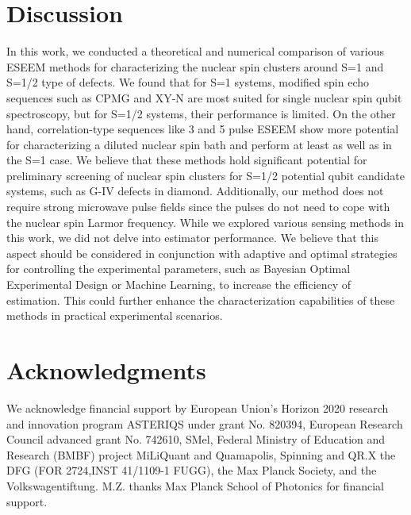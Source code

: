 \documentclass[%
 reprint,
superscriptaddress,
 amsmath,amssymb,
 aps,
]{revtex4-2}
\begin{document}
\section{Discussion}

In this work, we conducted a theoretical and numerical comparison of various ESEEM methods for characterizing the nuclear spin clusters around S=1 and S=1/2 type of defects.
We found that for S=1 systems, modified spin echo sequences such as CPMG and XY-N are most suited for single nuclear spin qubit spectroscopy, but for S=1/2 systems, their performance is limited. On the other hand, correlation-type sequences like 3 and 5 pulse ESEEM show more potential for characterizing a diluted nuclear spin bath and perform at least as well as in the S=1 case.
We believe that these methods hold significant potential for preliminary screening of nuclear spin clusters for S=1/2 potential qubit candidate systems, such as G-IV defects in diamond.
Additionally, our method does not require strong microwave pulse fields since the pulses do not need to cope with the nuclear spin Larmor frequency.
While we explored various sensing methods in this work, we did not delve into estimator performance.
We believe that this aspect should be considered in conjunction with adaptive and optimal strategies for controlling the experimental parameters, such as Bayesian Optimal Experimental Design or Machine Learning, to increase the efficiency of estimation.
This could further enhance the characterization capabilities of these methods in practical experimental scenarios.

\section*{Acknowledgments}
We acknowledge financial support by European Union's Horizon 2020 research and innovation program ASTERIQS under grant No. 820394, European Research Council advanced grant No. 742610, SMel, Federal Ministry of Education and Research (BMBF) project MiLiQuant and Quamapolis, Spinning and QR.X the DFG (FOR 2724,INST 41/1109-1 FUGG), the Max Planck Society, and the Volkswagentiftung. M.Z. thanks Max Planck School of Photonics for financial support.


\appendix
\end{document}
